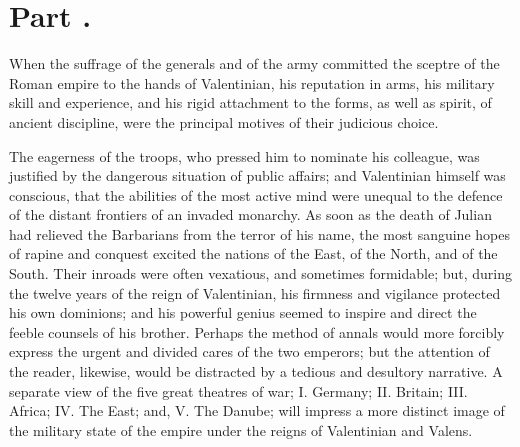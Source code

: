 


\section{Part \thesection.}

When the suffrage of the generals and of the army committed the
sceptre of the Roman empire to the hands of Valentinian, his
reputation in arms, his military skill and experience, and his
rigid attachment to the forms, as well as spirit, of ancient
discipline, were the principal motives of their judicious choice.

The eagerness of the troops, who pressed him to nominate his
colleague, was justified by the dangerous situation of public
affairs; and Valentinian himself was conscious, that the
abilities of the most active mind were unequal to the defence of
the distant frontiers of an invaded monarchy. As soon as the
death of Julian had relieved the Barbarians from the terror of
his name, the most sanguine hopes of rapine and conquest excited
the nations of the East, of the North, and of the South. Their
inroads were often vexatious, and sometimes formidable; but,
during the twelve years of the reign of Valentinian, his firmness
and vigilance protected his own dominions; and his powerful
genius seemed to inspire and direct the feeble counsels of his
brother. Perhaps the method of annals would more forcibly express
the urgent and divided cares of the two emperors; but the
attention of the reader, likewise, would be distracted by a
tedious and desultory narrative. A separate view of the five
great theatres of war; I. Germany; II. Britain; III. Africa; IV.
The East; and, V. The Danube; will impress a more distinct image
of the military state of the empire under the reigns of
Valentinian and Valens.

